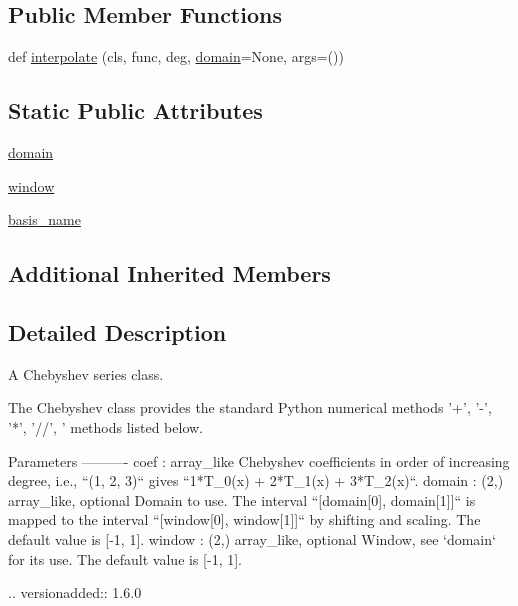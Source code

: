 \subsection*{Public Member Functions}
\begin{DoxyCompactItemize}
\item 
def \hyperlink{classnumpy_1_1polynomial_1_1chebyshev_1_1Chebyshev_ab13e941fd82e439d55cca84f1634db0d}{interpolate} (cls, func, deg, \hyperlink{classnumpy_1_1polynomial_1_1chebyshev_1_1Chebyshev_a407a7e4ab7716431158d269d9ea7204f}{domain}=None, args=())
\end{DoxyCompactItemize}
\subsection*{Static Public Attributes}
\begin{DoxyCompactItemize}
\item 
\hyperlink{classnumpy_1_1polynomial_1_1chebyshev_1_1Chebyshev_a407a7e4ab7716431158d269d9ea7204f}{domain}
\item 
\hyperlink{classnumpy_1_1polynomial_1_1chebyshev_1_1Chebyshev_a3f8e65f8634d1f0cbed3de58b6c55367}{window}
\item 
\hyperlink{classnumpy_1_1polynomial_1_1chebyshev_1_1Chebyshev_ae3f25afc1709d085936ac89fea3c7e29}{basis\+\_\+name}
\end{DoxyCompactItemize}
\subsection*{Additional Inherited Members}


\subsection{Detailed Description}
\begin{DoxyVerb}A Chebyshev series class.

The Chebyshev class provides the standard Python numerical methods
'+', '-', '*', '//', '%
methods listed below.

Parameters
----------
coef : array_like
    Chebyshev coefficients in order of increasing degree, i.e.,
    ``(1, 2, 3)`` gives ``1*T_0(x) + 2*T_1(x) + 3*T_2(x)``.
domain : (2,) array_like, optional
    Domain to use. The interval ``[domain[0], domain[1]]`` is mapped
    to the interval ``[window[0], window[1]]`` by shifting and scaling.
    The default value is [-1, 1].
window : (2,) array_like, optional
    Window, see `domain` for its use. The default value is [-1, 1].

    .. versionadded:: 1.6.0\end{DoxyVerb}
 

